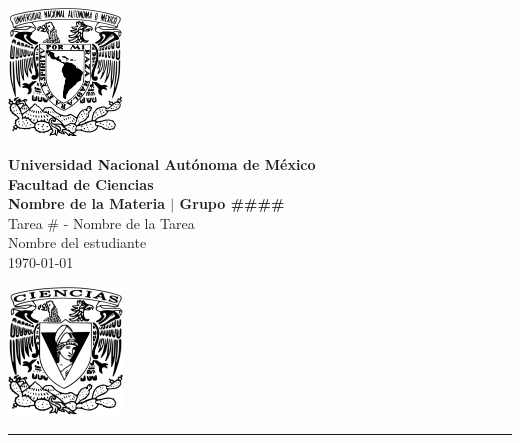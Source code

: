 \documentclass[11pt,letterpaper]{article}
\begin{document}
\begin{center}
    \begin{minipage}{3cm}
    	\begin{center}
    		\includegraphics[height=3.4cm]{Logo_UNAM.png}
    	\end{center}
    \end{minipage}\hfill
    \begin{minipage}{10cm}
    	\begin{center}
    	\textbf{\large Universidad Nacional Autónoma de México}\\[0.1cm]
        \textbf{Facultad de Ciencias}\\[0.1cm]
        \textbf{Nombre de la Materia $|$ Grupo \#\#\#\#}\\[0.1cm]
        Tarea \# - Nombre de la Tarea\\[0.1cm]
        Nombre del estudiante\\[0.1cm]
        \today
    	\end{center}
    \end{minipage}\hfill
    \begin{minipage}{3cm}
    	\begin{center}
    		\includegraphics[height=3.4cm]{Logo_FC.png}
    	\end{center}
    \end{minipage}
\end{center}

\rule{17cm}{0.1mm}


\end{document}
